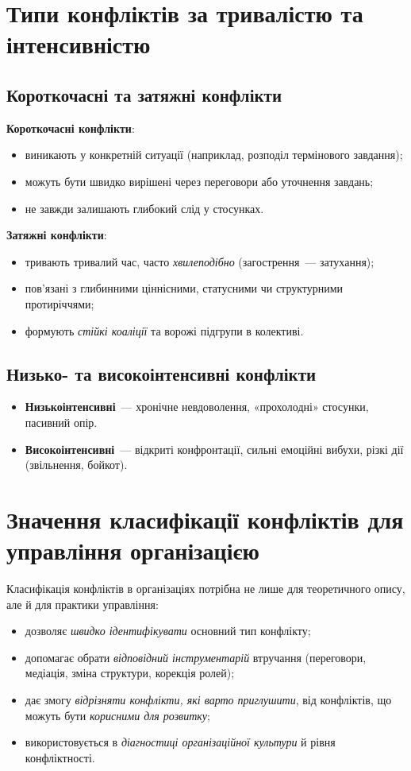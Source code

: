 \documentclass[12pt,a4paper]{article}
\begin{document}
    \section*{Типи конфліктів за тривалістю та інтенсивністю}
    \subsection*{Короткочасні та затяжні конфлікти}
    \textbf{Короткочасні конфлікти}:
    \begin{itemize}
        \item виникають у конкретній ситуації (наприклад, розподіл термінового завдання);
        \item можуть бути швидко вирішені через переговори або уточнення завдань;
        \item не завжди залишають глибокий слід у стосунках.
    \end{itemize}

    \textbf{Затяжні конфлікти}:
    \begin{itemize}
        \item тривають тривалий час, часто \textit{хвилеподібно} (загострення~--- затухання);
        \item пов’язані з глибинними ціннісними, статусними чи структурними протиріччями;
        \item формують \textit{стійкі коаліції} та ворожі підгрупи в колективі.
    \end{itemize}

    \subsection*{Низько- та високоінтенсивні конфлікти}
    \begin{itemize}
        \item \textbf{Низькоінтенсивні}~--- хронічне невдоволення, «прохолодні» стосунки, пасивний опір.
        \item \textbf{Високоінтенсивні}~--- відкриті конфронтації, сильні емоційні вибухи, різкі дії (звільнення, бойкот).
    \end{itemize}

    \section*{Значення класифікації конфліктів для управління організацією}
    Класифікація конфліктів в організаціях потрібна не лише для теоретичного опису, але й для практики управління:
    \begin{itemize}
        \item дозволяє \textit{швидко ідентифікувати} основний тип конфлікту;
        \item допомагає обрати \textit{відповідний інструментарій} втручання (переговори, медіація, зміна структури, корекція ролей);
        \item дає змогу \textit{відрізняти конфлікти, які варто приглушити}, від конфліктів, що можуть бути \textit{корисними для розвитку};
        \item використовується в \textit{діагностиці організаційної культури} й рівня конфліктності.
    \end{itemize}
\end{document}
